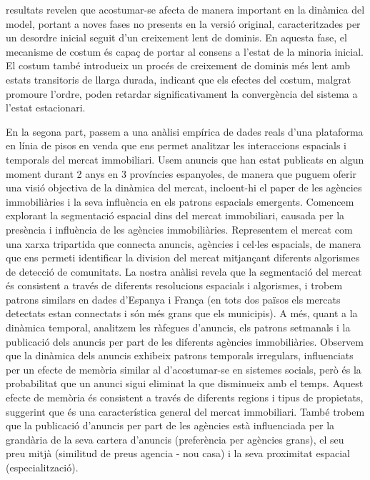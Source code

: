 resultats revelen que acostumar-se afecta de manera important en la dinàmica del model, portant a noves fases no presents en la versió original, caracteritzades per un desordre inicial seguit d'un creixement lent de dominis. En aquesta fase, el mecanisme de costum és capaç de portar al consens a l'estat de la minoria inicial. El costum també introdueix un procés de creixement de dominis més lent amb estats transitoris de llarga durada, indicant que els efectes del costum, malgrat promoure l'ordre, poden retardar significativament la convergència del sistema a l'estat estacionari.

En la segona part, passem a una anàlisi empírica de dades reals d'una plataforma en línia de pisos en venda que ens permet analitzar les interaccions espacials i temporals del mercat immobiliari. Usem anuncis que han estat publicats en algun moment durant 2 anys en 3 províncies espanyoles, de manera que puguem oferir una visió objectiva de la dinàmica del mercat, incloent-hi el paper de les agències immobiliàries i la seva influència en els patrons espacials emergents. Comencem explorant la segmentació espacial dins del mercat immobiliari, causada per la presència i influència de les agències immobiliàries. Representem el mercat com una xarxa tripartida que connecta anuncis, agències i cel$\cdot$les espacials, de manera que ens permeti identificar la division del mercat mitjançant diferents algorismes de detecció de comunitats. La nostra anàlisi revela que la segmentació del mercat és consistent a través de diferents resolucions espacials i algorismes, i trobem patrons similars en dades d'Espanya i França (en tots dos països els mercats detectats estan connectats i són més grans que els municipis). A més, quant a la dinàmica temporal, analitzem les ràfegues d'anuncis, els patrons setmanals i la publicació dels anuncis per part de les diferents agències immobiliàries. Observem que la dinàmica dels anuncis exhibeix patrons temporals irregulars, influenciats per un efecte de memòria similar al d'acostumar-se en sistemes socials, però és la probabilitat que un anunci sigui eliminat la que disminueix amb el temps. Aquest efecte de memòria és consistent a través de diferents regions i tipus de propietats, suggerint que és una característica general del mercat immobiliari. També trobem que la publicació d'anuncis per part de les agències està influenciada per la grandària de la seva cartera d'anuncis (preferència per agències grans), el seu preu mitjà (similitud de preus agencia - nou casa) i la seva proximitat espacial (especialització).

